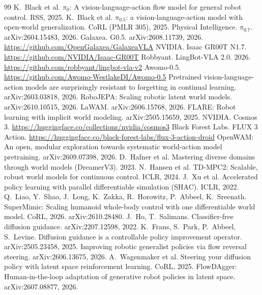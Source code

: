 \documentclass[10pt,a4paper]{article}
\newcommand{\pz}{$\pi_{0}$}
\newcommand{\pzf}{$\pi_{0.5}$}
\newcommand{\pzs}{$\pi_{0.7}$}
\begin{document}
\begin{thebibliography}{99}\small
{} K.~Black et al. \pz: A vision-language-action flow model for general robot control. RSS, 2025.
 K.~Black et al. \pzf: a vision-language-action model with open-world generalization. CoRL (PMLR 305), 2025.
 Physical Intelligence. \pzs. arXiv:2604.15483, 2026.
 Galaxea. G0.5. arXiv:2608.11739, 2026. \url{https://github.com/OpenGalaxea/GalaxeaVLA}
 NVIDIA. Isaac GR00T N1.7. \url{https://github.com/NVIDIA/Isaac-GR00T}
 Robbyant. LingBot-VLA 2.0. 2026. \url{https://github.com/robbyant/lingbot-vla-v2}
 Awomo-0.5. \url{https://github.com/Awomo-WestlakeDI/Awomo-0.5}
 Pretrained vision-language-action models are surprisingly resistant to forgetting in continual learning. arXiv:2603.03818, 2026.
 RoboJEPA: Scaling robotic latent world models. arXiv:2610.10515, 2026.
 LaWAM. arXiv:2606.15768, 2026.
 FLARE: Robot learning with implicit world modeling. arXiv:2505.15659, 2025.
 NVIDIA. Cosmos 3. \url{https://huggingface.co/collections/nvidia/cosmos3}
 Black Forest Labs. FLUX 3 Action. \url{https://huggingface.co/black-forest-labs/flux-3-action-droid}
 OpenWAM: An open, modular exploration towards systematic world-action model pretraining. arXiv:2609.07398, 2026.
 D.~Hafner et al. Mastering diverse domains through world models (DreamerV3). 2023.
 N.~Hansen et al. TD-MPC2: Scalable, robust world models for continuous control. ICLR, 2024.
 J.~Xu et al. Accelerated policy learning with parallel differentiable simulation (SHAC). ICLR, 2022.
 Q.~Liao, Y.~Shao, J.~Long, K.~Zakka, R.~Horowitz, P.~Abbeel, K.~Sreenath. SuperMimic: Scaling humanoid whole-body control with one differentiable world model. CoRL, 2026. arXiv:2610.28480.
 J.~Ho, T.~Salimans. Classifier-free diffusion guidance. arXiv:2207.12598, 2022.
 K.~Frans, S.~Park, P.~Abbeel, S.~Levine. Diffusion guidance is a controllable policy improvement operator. arXiv:2505.23458, 2025.
 Improving robotic generalist policies via flow reversal steering. arXiv:2606.13675, 2026.
 A.~Wagenmaker et al. Steering your diffusion policy with latent space reinforcement learning. CoRL, 2025.
 FlowDAgger: Human-in-the-loop adaptation of generative robot policies in latent space. arXiv:2607.08877, 2026.

\end{thebibliography}
\end{document}
